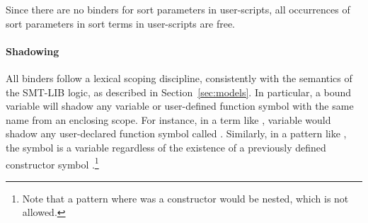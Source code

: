 \begin{newver}
\begin{remark}
  Since there are no binders for sort parameters in user-scripts,
  all occurrences of sort parameters in sort terms in user-scripts
  are free.
\end{remark}
\end{newver}

\paragraph{Shadowing}
All binders follow a lexical scoping discipline, 
consistently with the semantics of the SMT-LIB logic,
as described in Section~\ref{sec:models}.
In particular, a bound variable will shadow any variable or user-defined 
function symbol with the same name from an enclosing scope.
For instance, in a term like
,
variable  would shadow any user-declared function symbol
called .
Similarly, in a  pattern like ,
the symbol  is a variable regardless of the existence 
of a previously defined constructor symbol .\footnote{%
Note that a pattern  where  was a constructor
would be nested, which is not allowed. 
}

